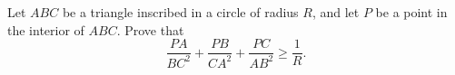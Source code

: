 Let $ABC$ be a triangle inscribed in a circle of radius $R$, and let $P$ be a point in the interior of $ABC$. Prove that \[\frac{PA}{BC^2}+\frac{PB}{CA^2}+\frac{PC}{AB^2}\geq\frac{1}{R}.\]